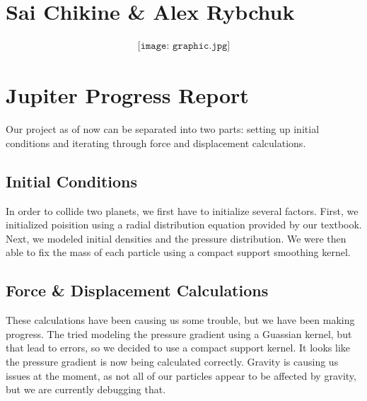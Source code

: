 \documentclass[12pt]{article}
\newcommand{\pdfgraphics}{\ifpdf\DeclareGraphicsExtensions{.pdf,.jpg}\else\fi}
\begin{document}

\section*{Sai Chikine \& Alex Rybchuk}  %
\begin{align*}
\texttt{[image: graphic.jpg]}
\end{align*}                                                                          



\section*{Jupiter Progress Report}  
Our project as of now can be separated into two parts: setting up initial conditions and iterating through force and displacement calculations.

\subsection*{Initial Conditions}
In order to collide two planets, we first have to initialize several factors. First, we initialized poisition using a radial distribution equation provided by our textbook. Next, we modeled initial densities and the pressure distribution. We were then able to fix the mass of each particle using a compact support smoothing kernel. 

\subsection*{Force \& Displacement Calculations}
These calculations have been causing us some trouble, but we have been making progress. The tried modeling the pressure gradient using a Guassian kernel, but that lead to errors, so we decided to use a compact support kernel. It looks like the pressure gradient is now being calculated correctly. Gravity is causing us issues at the moment, as not all of our particles appear to be affected by gravity, but we are currently debugging that. 
\end{document}
